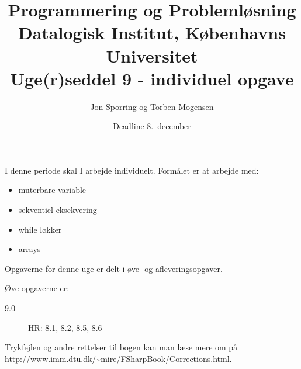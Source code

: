 \documentclass[a4paper,12pt]{article}
\title{Programmering og Problemløsning\\Datalogisk Institut,
  Københavns Universitet\\Uge(r)seddel 9 - individuel opgave}
\author{Jon Sporring og Torben Mogensen}
\date{Deadline  8.\ december}
\begin{document}
\maketitle

I denne periode skal I arbejde individuelt. Formålet er at arbejde med:
\begin{itemize}
\item muterbare variable
\item sekventiel eksekvering
\item while løkker
\item arrays
\end{itemize}

Opgaverne for denne uge er delt i øve- og afleveringsopgaver. 

Øve-opgaverne er:
\begin{description}
\item[9.0] HR: 8.1, 8.2, 8.5, 8.6
\end{description}
Trykfejlen og andre rettelser til bogen kan man læse mere om på \url{http://www.imm.dtu.dk/~mire/FSharpBook/Corrections.html}.
\end{document}

